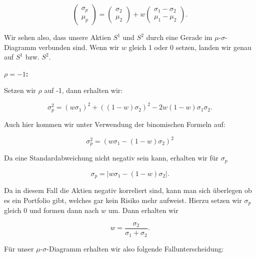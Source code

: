 \documentclass[parskip=half]{scrartcl}
\begin{document}
	\begin{equation*}
		\begin{pmatrix} \sigma_p \\ \mu_p \end{pmatrix} = \begin{pmatrix} \sigma_2 \\ \mu_2 \end{pmatrix} + w \begin{pmatrix} \sigma_1 - \sigma_2 \\ \mu_1 - \mu_2 \end{pmatrix} .
	\end{equation*}
	
	Wir sehen also, dass unsere Aktien $S^1$ und $S^2$ durch eine Gerade im $\mu$-$\sigma$-Diagramm verbunden sind. Wenn wir $w$ gleich 1 oder 0 setzen, landen wir genau auf $S^1$ bzw. $S^2$.
	
	\textbf{$\rho = -1$:}
	
	Setzen wir $\rho$ auf -1, dann erhalten wir:
	
	\begin{equation*}
		\sigma_p^2 = (w \sigma_1)^2 + ((1 - w) \sigma_2)^2 - 2w(1 - w)\sigma_1 \sigma_2 .
	\end{equation*}
	
	Auch hier kommen wir unter Verwendung der binomischen Formeln auf:
	
	\begin{equation*}
		\sigma_p^2 = (w \sigma_1 - (1-w)\sigma_2)^2
	\end{equation*}
	
	Da eine Standardabweichung nicht negativ sein kann, erhalten wir für $\sigma_p$
	
	\begin{equation*}
		\sigma_p = \left| w \sigma_1 - (1-w) \sigma_2 \right| .
	\end{equation*}
	
	Da in diesem Fall die Aktien negativ korreliert sind, kann man sich überlegen ob es ein Portfolio gibt, welches gar kein Risiko mehr aufweist. Hierzu setzen wir $\sigma_p$ gleich 0 und formen dann nach $w$ um. Dann erhalten wir
	
	\begin{equation*}
		w = \frac{\sigma_2}{\sigma_1 + \sigma_2} .
	\end{equation*}
	
	\clearpage
	
	Für unser $\mu$-$\sigma$-Diagramm erhalten wir also folgende Fallunterscheidung:
	
\end{document}

